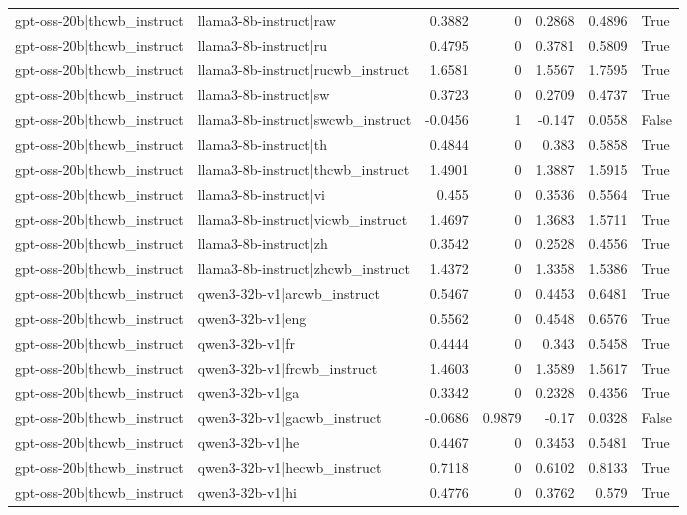 \begin{table}
\begin{tabular}{l l r r r r l}
gpt-oss-20b|thcwb_instruct & llama3-8b-instruct|raw & 0.3882 & 0 & 0.2868 & 0.4896 & True \\
gpt-oss-20b|thcwb_instruct & llama3-8b-instruct|ru & 0.4795 & 0 & 0.3781 & 0.5809 & True \\
gpt-oss-20b|thcwb_instruct & llama3-8b-instruct|rucwb_instruct & 1.6581 & 0 & 1.5567 & 1.7595 & True \\
gpt-oss-20b|thcwb_instruct & llama3-8b-instruct|sw & 0.3723 & 0 & 0.2709 & 0.4737 & True \\
gpt-oss-20b|thcwb_instruct & llama3-8b-instruct|swcwb_instruct & -0.0456 & 1 & -0.147 & 0.0558 & False \\
gpt-oss-20b|thcwb_instruct & llama3-8b-instruct|th & 0.4844 & 0 & 0.383 & 0.5858 & True \\
gpt-oss-20b|thcwb_instruct & llama3-8b-instruct|thcwb_instruct & 1.4901 & 0 & 1.3887 & 1.5915 & True \\
gpt-oss-20b|thcwb_instruct & llama3-8b-instruct|vi & 0.455 & 0 & 0.3536 & 0.5564 & True \\
gpt-oss-20b|thcwb_instruct & llama3-8b-instruct|vicwb_instruct & 1.4697 & 0 & 1.3683 & 1.5711 & True \\
gpt-oss-20b|thcwb_instruct & llama3-8b-instruct|zh & 0.3542 & 0 & 0.2528 & 0.4556 & True \\
gpt-oss-20b|thcwb_instruct & llama3-8b-instruct|zhcwb_instruct & 1.4372 & 0 & 1.3358 & 1.5386 & True \\
gpt-oss-20b|thcwb_instruct & qwen3-32b-v1|arcwb_instruct & 0.5467 & 0 & 0.4453 & 0.6481 & True \\
gpt-oss-20b|thcwb_instruct & qwen3-32b-v1|eng & 0.5562 & 0 & 0.4548 & 0.6576 & True \\
gpt-oss-20b|thcwb_instruct & qwen3-32b-v1|fr & 0.4444 & 0 & 0.343 & 0.5458 & True \\
gpt-oss-20b|thcwb_instruct & qwen3-32b-v1|frcwb_instruct & 1.4603 & 0 & 1.3589 & 1.5617 & True \\
gpt-oss-20b|thcwb_instruct & qwen3-32b-v1|ga & 0.3342 & 0 & 0.2328 & 0.4356 & True \\
gpt-oss-20b|thcwb_instruct & qwen3-32b-v1|gacwb_instruct & -0.0686 & 0.9879 & -0.17 & 0.0328 & False \\
gpt-oss-20b|thcwb_instruct & qwen3-32b-v1|he & 0.4467 & 0 & 0.3453 & 0.5481 & True \\
gpt-oss-20b|thcwb_instruct & qwen3-32b-v1|hecwb_instruct & 0.7118 & 0 & 0.6102 & 0.8133 & True \\
gpt-oss-20b|thcwb_instruct & qwen3-32b-v1|hi & 0.4776 & 0 & 0.3762 & 0.579 & True \\

\end{tabular}
\end{table}
